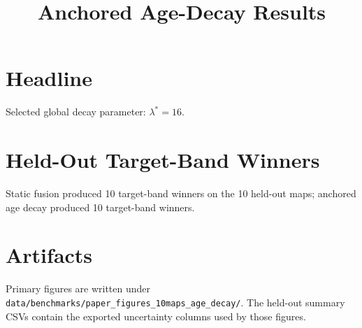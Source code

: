 \documentclass[conference]{IEEEtran}
\begin{document}
\title{Anchored Age-Decay Results}
\maketitle
\section{Headline}
Selected global decay parameter: $\lambda^* = 16$.

\section{Held-Out Target-Band Winners}
Static fusion produced 10 target-band winners on the 10 held-out maps; anchored age decay produced 10 target-band winners.

\section{Artifacts}
Primary figures are written under \texttt{data/benchmarks/paper\_figures\_10maps\_age\_decay/}. The held-out summary CSVs contain the exported uncertainty columns used by those figures.
\end{document}
